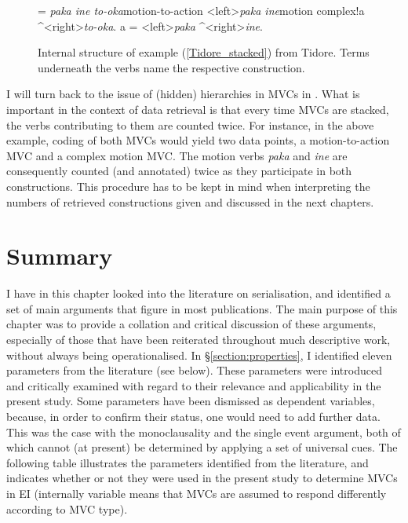 \begin{figure}[h]
\jtree[xunit=8em]
\! = {\textit{paka ine to-oka}}{motion-to-action}
<left>{\textit{paka ine}}{motion complex}!a ^<right>{\textit{to-oka}}.
\!a = <left>{\textit{paka}} ^<right>{\textit{ine}}.
\endjtree


\caption[Internal structure of example (\ref{Tidore_stacked}) from Tidore]{Internal structure of example (\ref{Tidore_stacked}) from Tidore. Terms underneath the verbs name the respective construction.}
\label{figure:tidoreMVC}
\end{figure}

I will turn back to the issue of (hidden) hierarchies in MVCs in . What is important in the context of data retrieval is that every time MVCs are stacked, the verbs contributing to them are counted twice. For instance, in the above example, coding of both MVCs would yield two data points, a motion-to-action MVC and a complex motion MVC. The motion verbs \textit{paka} and \textit{ine} are consequently counted (and annotated) twice as they participate in both constructions. This procedure has to be kept in mind when interpreting the numbers of retrieved constructions given and discussed in the next chapters.

\section{Summary}

I have in this chapter looked into the literature on serialisation, and identified a set of main arguments that figure in most publications. The main purpose of this chapter was to provide a collation and critical discussion of these arguments, especially of those that have been reiterated throughout much descriptive work, without always being operationalised. In §\ref{section:properties}, I identified eleven parameters from the literature (see below). These parameters were introduced and critically examined with regard to their relevance and applicability in the present study. Some parameters have been dismissed as dependent variables, because, in order to confirm their status, one would need to add further data. This was the case with the monoclausality and the single event argument, both of which cannot (at present) be determined by applying a set of universal cues. The following table illustrates the parameters identified from the literature, and indicates whether or not they were used in the present study to determine MVCs in EI (internally variable means that MVCs are assumed to respond differently according to MVC type).

